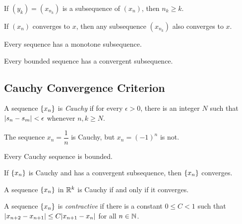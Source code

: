 \documentclass{article}
\begin{document}
\begin{remark}
  If $(y_k) = (x_{n_k})$ is a subsequence of $(x_n)$, then $n_k \geq k$.
\end{remark}

\begin{theorem}
  If $(x_n)$ converges to $x$, then any subsequence $(x_{n_k})$ also converges to $x$.
\end{theorem}

\begin{theorem}
  Every sequence has a monotone subsequence.
\end{theorem}

\begin{theorem}
  Every bounded sequence has a convergent subsequence.
\end{theorem}

\subsection{Cauchy Convergence Criterion}

\begin{definition}
  A sequence $\{x_n\}$ is \emph{Cauchy} if for every $\epsilon > 0$, there is an integer $N$ such that $\abs{s_n - s_m} < \epsilon$ whenever $n, k \geq N$.
\end{definition}

\begin{example}
  The sequence $x_n = \dfrac{1}{n}$ is Cauchy, but $x_n = (-1)^n$ is not.
\end{example}

\begin{theorem}
  Every Cauchy sequence is bounded.
\end{theorem}

\begin{theorem}
  If $\{x_n\}$ is Cauchy and has a convergent subsequence, then $\{x_n\}$ converges.
\end{theorem}

\begin{theorem}
  A sequence $\{x_n\}$ in $\mathbb{R}^k$ is Cauchy if and only if it converges.
\end{theorem}

\begin{definition}
  A sequence $\{x_n\}$ is \emph{contractive} if there is a constant $0 \leq C < 1$ such that $\abs{x_{n + 2} - x_{n + 1}} \leq C \abs{x_{n + 1} - x_{n}}$ for all $n \in \mathbb{N}$.
\end{definition}
\end{document}
